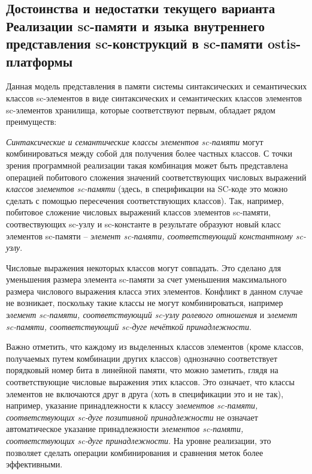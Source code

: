 \subsection{Достоинства и недостатки текущего варианта Реализации sc-памяти и языка внутреннего представления sc-конструкций в sc-памяти ostis-платформы}
\label{sec_soft_platform_scin_code_problems}

Данная модель представления в памяти системы синтаксических и семантических классов sc-элементов в виде синтаксических и семантических классов элементов sc-элементов хранилища, которые соответствуют первым, обладает рядом преимуществ:
\begin{textitemize}
    \item \textit{Синтаксические и семантические классы элементов sc-памяти} могут комбинироваться между собой для получения более частных классов. С точки зрения программной реализации такая комбинация может быть представлена операцией побитового сложения значений соответствующих числовых выражений \textit{классов элементов sc-памяти} (здесь, в спецификации на SC-коде это можно сделать с помощью пересечения соответствующих классов). Так, например, побитовое сложение числовых выражений классов элементов sc-памяти, соотвествующих sc-узлу и sc-константе в результате образуют новый класс элементов sc-памяти -- \textit{элемент sc-памяти, соответствующий константному sc-узлу}.
    \item Числовые выражения некоторых классов могут совпадать. Это сделано для уменьшения размера элемента sc-памяти за счет уменьшения максимального размера числового выражения класса этих элементов. Конфликт в данном случае не возникает, поскольку такие классы не могут комбинироваться, например \textit{элемент sc-памяти, соответствующий sc-узлу ролевого отношения} и \textit{элемент sc-памяти, соответствующий sc-дуге нечёткой принадлежности}.
    \item Важно отметить, что каждому из выделенных классов элементов (кроме классов, получаемых путем комбинации других классов) однозначно соответствует порядковый номер бита в линейной памяти, что можно заметить, глядя на соответствующие числовые выражения этих классов. Это означает, что классы элементов не включаются друг в друга (хоть в спецификации это и не так), например, указание принадлежности к классу \textit{элементов sc-памяти, соответствующих sc-дуге позитивной принадлежности} не означает автоматическое указание принадлежности \textit{элементов sc-памяти, соответствующих sc-дуге принадлежности}. На уровне реализации, это позволяет сделать операции комбинирования и сравнения меток более эффективными.
\end{textitemize}

